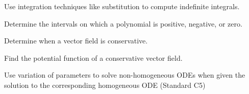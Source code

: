 \begin{readinessAssuranceOutcomes}
\item Use integration techniques like substitution to compute indefinite integrals. 
\item Determine the intervals on which a polynomial is positive, negative, or zero.
\item Determine when a vector field is conservative.
\item Find the potential function of a conservative vector field.
\item Use variation of parameters to solve non-homogeneous ODEs when given the solution to the corresponding homogeneous ODE (Standard C5)
\end{readinessAssuranceOutcomes}
